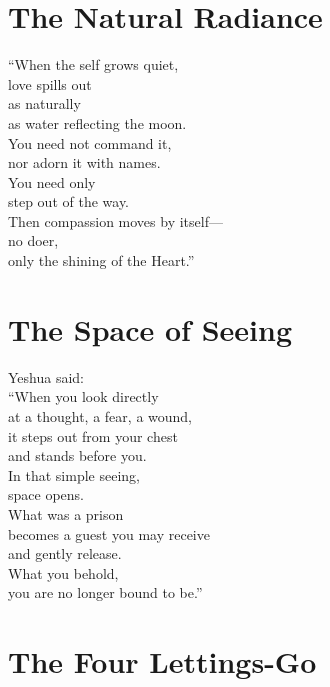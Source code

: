 \documentclass[10pt, openright]{book}
\newcommand{\sectionbreak}{\filbreak}
\begin{document}
\sectionbreak

\section{The Natural Radiance}\label{the-natural-radiance}

``When the self grows quiet,\\
love spills out\\
as naturally\\
as water reflecting the moon.\\
You need not command it,\\
nor adorn it with names.\\
You need only\\
step out of the way.\\
Then compassion moves by itself---\\
no doer,\\
only the shining of the Heart.''

\sectionbreak

\section{The Space of Seeing}\label{the-space-of-seeing}

Yeshua said:\\
``When you look directly\\
at a thought, a fear, a wound,\\
it steps out from your chest\\
and stands before you.\\
In that simple seeing,\\
space opens.\\
What was a prison\\
becomes a guest you may receive\\
and gently release.\\
What you behold,\\
you are no longer bound to be.''

\sectionbreak

\section{The Four Lettings-Go}\label{the-four-lettings-go}
\end{document}
